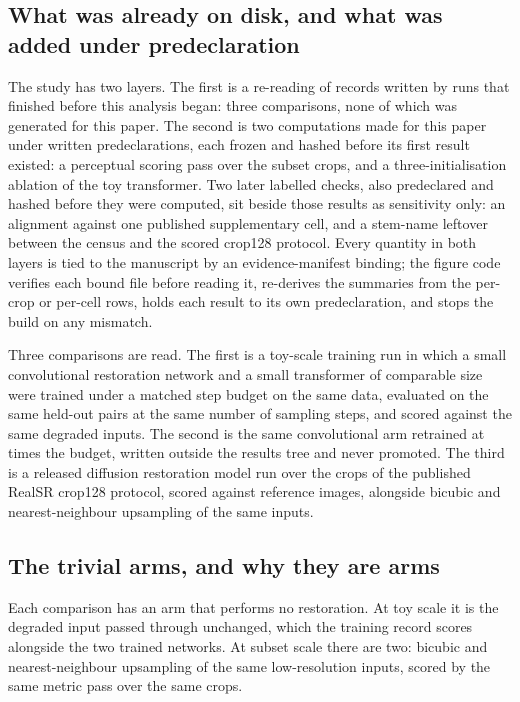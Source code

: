 \subsection{What was already on disk, and what was added under predeclaration}

The study has two layers. The first is a re-reading of records written by runs
that finished before this analysis began: three comparisons, none of which was
generated for this paper. The second is two computations made for this paper
under written predeclarations, each frozen and hashed before its first result
existed: a perceptual scoring pass over the subset crops, and a
three-initialisation ablation of the toy transformer. Two later labelled
checks, also predeclared and hashed before they were computed, sit beside
those results as sensitivity only: an alignment against one published
supplementary cell, and a stem-name leftover between the census and the
scored crop128 protocol. Every quantity in both
layers is tied to the manuscript by an evidence-manifest binding; the figure
code verifies each bound file before reading it, re-derives the summaries from
the per-crop or per-cell rows, holds each result to its own predeclaration, and
stops the build on any mismatch.

Three comparisons are read. The first is a toy-scale training run in which a
small convolutional restoration network and a small transformer of comparable
size were trained under a matched step budget on the same data, evaluated on the
same \ToyN{} held-out pairs at the same number of sampling steps, and scored
against the same degraded inputs. The second is the same convolutional arm
retrained at \BudgetMultiple{} times the budget, written outside the results tree
and never promoted. The third is a released diffusion restoration model run over
the \SubsetN{} crops of the published RealSR crop128 protocol, scored against
reference images, alongside bicubic and nearest-neighbour upsampling of the same
inputs.

\subsection{The trivial arms, and why they are arms}

Each comparison has an arm that performs no restoration. At toy scale it is the
degraded input passed through unchanged, which the training record scores
alongside the two trained networks. At subset scale there are two: bicubic and
nearest-neighbour upsampling of the same low-resolution inputs, scored by the
same metric pass over the same crops.


